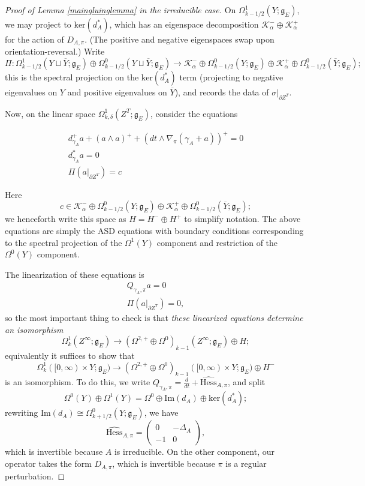 \documentclass{memo-l}
\theoremstyle{definition}
\theoremstyle{remark}
\numberwithin{section}{chapter}
\numberwithin{equation}{chapter}
\begin{document}
\begin{proof}[Proof of Lemma \ref{maingluinglemma} in the irreducible case]
On $\Omega^1_{k-1/2}(Y;\mathfrak g_E)$, we may project to $\text{ker}(d_A^*)$, which has an eigenspace decomposition $\mathcal K^-_\alpha \oplus \mathcal K^+_\alpha$ for the action of $D_{A,\pi}$. (The positive and negative eigenspaces swap upon orientation-reversal.) Write $$\Pi: \Omega^1_{k-1/2}(Y \sqcup \overline Y; \mathfrak g_E) \oplus \Omega^0_{k-1/2}(Y \sqcup \overline Y; \mathfrak g_E) \to \mathcal K^-_\alpha \oplus \Omega^0_{k-1/2}(Y;\mathfrak g_E) \oplus \mathcal K^+_\alpha \oplus \Omega^0_{k-1/2}(\overline Y; \mathfrak g_E);$$ this is the spectral projection on the $\text{ker}(d_A^*)$ term (projecting to negative eigenvalues on $Y$ and positive eigenvalues on $\overline Y$), and records the data of $\sigma \big|_{\partial Z^T}$.

Now, on the linear space $\Omega^1_{k,\delta}(Z^T;\mathfrak g_E)$, consider the equations

\begin{align*} d_{\gamma_A}^+ a + (a \wedge a)^+ + \left(dt \wedge \nabla_\pi(\gamma_A + a)\right)^+ = 0 \\
d_{\gamma_A}^* a = 0 \\
\Pi (a \big|_{\partial Z^T}) = c \end{align*}

Here $$c \in \mathcal K^-_\alpha \oplus \Omega^0_{k-1/2}(Y;\mathfrak g_E) \oplus \mathcal K^+_\alpha \oplus \Omega^0_{k-1/2}(\overline Y; \mathfrak g_E);$$ we henceforth write this space as $H = H^- \oplus H^+$ to simplify notation. The above equations are simply the ASD equations with boundary conditions corresponding to the spectral projection of the $\Omega^1(Y)$ component and restriction of the $\Omega^0(Y)$ component.

The linearization of these equations is \begin{align*} Q_{\gamma_A, \pi} a = 0 \\
\Pi(a \big|_{\partial Z^T}) = 0,\end{align*}
so the most important thing to check is that \emph{these linearized equations determine an isomorphism} 
$$\Omega^1_{k}(Z^\infty;\mathfrak g_E) \to (\Omega^{2,+} \oplus \Omega^0)_{k-1}(Z^\infty; \mathfrak g_E) \oplus H;$$ 
equivalently it suffices to show that 
$$\Omega^1_k([0,\infty) \times Y; \mathfrak g_E) \to (\Omega^{2,+} \oplus \Omega^0)_{k-1}([0,\infty) \times Y; \mathfrak g_E) \oplus H^-$$ 
is an isomorphism. To do this, we write $Q_{\gamma_A, \pi} = \frac d{dt} + \widehat{\text{Hess}}_{A,\pi}$, and split 
$$\Omega^0(Y) \oplus \Omega^1(Y) = \Omega^0 \oplus \text{Im}(d_A) \oplus \text{ker}(d_A^*);$$ 
rewriting $\text{Im}(d_A) \cong \Omega^0_{k+1/2}(Y;\mathfrak g_E)$, we have 
$$\widehat{\text{Hess}}_{A,\pi} = \begin{pmatrix}0 & - \Delta_A \\ -1 & 0\end{pmatrix},$$
which is invertible because $A$ is irreducible. On the other component, our operator takes the form $D_{A,\pi}$, which is invertible because $\pi$ is a regular perturbation.


\end{proof}
\end{document}
